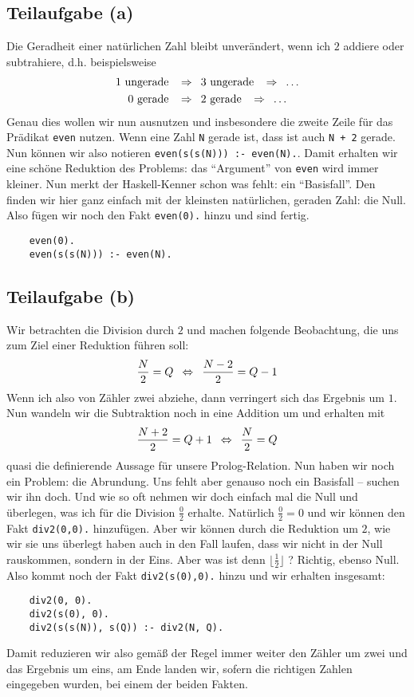 \documentclass[ngerman, a4paper, 11pt]{article}
\theoremstyle{nonumberplain}
\begin{document}
\subsection*{Teilaufgabe (a)}

Die Geradheit einer natürlichen Zahl bleibt unverändert, wenn ich $2$ addiere oder subtrahiere, d.h. beispielsweise
\begin{align*}
	1 \text{ ungerade } &\enskip \Rightarrow \enskip 3 \text{ ungerade } \enskip \Rightarrow \enskip \dots \\
	0 \text{ gerade } &\enskip \Rightarrow \enskip 2 \text{ gerade } \enskip \Rightarrow \enskip \dots \\
\end{align*}
Genau dies wollen wir nun ausnutzen und insbesondere die zweite Zeile für das Prädikat \texttt{even} nutzen. Wenn eine Zahl \texttt{N} gerade ist, dass ist auch \texttt{N + 2} gerade. Nun können wir also notieren \texttt{even(s(s(N))) :- even(N).}. Damit erhalten wir eine schöne Reduktion des Problems: das \enquote{Argument} von \texttt{even} wird immer kleiner. Nun merkt der Haskell-Kenner schon was fehlt: ein \enquote{Basisfall}. Den finden wir hier ganz einfach mit der kleinsten natürlichen, geraden Zahl: die Null. Also fügen wir noch den Fakt \texttt{even(0).} hinzu und sind fertig.
\begin{lstlisting}
	even(0).
	even(s(s(N))) :- even(N).
\end{lstlisting}


\subsection*{Teilaufgabe (b)}

Wir betrachten die Division durch $2$ und machen folgende Beobachtung, die uns zum Ziel einer Reduktion führen soll:
\begin{equation*}
	\frac{N}{2} = Q \enskip \Leftrightarrow \enskip \frac{N-2}{2} = Q - 1
\end{equation*}
Wenn ich also von Zähler zwei abziehe, dann verringert sich das Ergebnis um $1$. Nun wandeln wir die Subtraktion noch in eine Addition um und erhalten mit
\begin{equation*}
	\frac{N+2}{2} = Q +1 \enskip \Leftrightarrow \enskip \frac{N}{2} = Q 
\end{equation*}
quasi die definierende Aussage für unsere Prolog-Relation.
Nun haben wir noch ein Problem: die Abrundung. Uns fehlt aber genauso noch ein Basisfall -- suchen wir ihn doch. Und wie so oft nehmen wir doch einfach mal die Null und überlegen, was ich für die Division $\frac 0 2$ erhalte. Natürlich $\frac 0 2 = 0$ und wir können den Fakt \texttt{div2(0,0).} hinzufügen. Aber wir können durch die Reduktion um $2$, wie wir sie uns überlegt haben auch in den Fall laufen, dass wir nicht in der Null rauskommen, sondern in der Eins. Aber was ist denn $\lfloor \frac 1 2 \rfloor$ ? Richtig, ebenso Null. Also kommt noch der Fakt \texttt{div2(s(0),0).} hinzu und wir erhalten insgesamt:
\begin{lstlisting}
	div2(0, 0).
	div2(s(0), 0). 
	div2(s(s(N)), s(Q)) :- div2(N, Q).
\end{lstlisting}
Damit reduzieren wir also gemäß der Regel immer weiter den Zähler um zwei und das Ergebnis um eins, am Ende landen wir, sofern die richtigen Zahlen eingegeben wurden, bei einem der beiden Fakten. 
\end{document}
